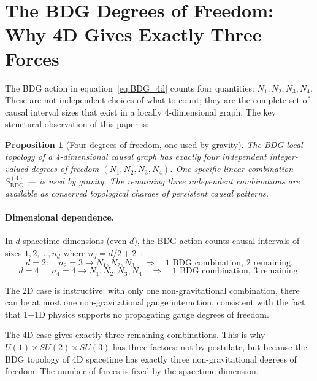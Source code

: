 \documentclass[11pt,a4paper]{article}
\newtheorem{proposition}[theorem]{Proposition}
\newcommand{\SBDG}{S_{\mathrm{BDG}}}
\begin{document}
\section{The BDG Degrees of Freedom: Why 4D Gives Exactly Three Forces}
\label{sec:four_dof}

The BDG action in equation~\eqref{eq:BDG_4d} counts four quantities: $N_1, N_2,
N_3, N_4$. These are not independent choices of what to count; they are the
complete set of causal interval sizes that exist in a locally 4-dimensional
graph. The key structural observation of this paper is:

\begin{proposition}[Four degrees of freedom, one used by gravity]
\label{prop:dof}
The BDG local topology of a 4-dimensional causal graph has exactly four
independent integer-valued degrees of freedom $(N_1, N_2, N_3, N_4)$.
One specific linear combination --- $\SBDG^{(4)}$ --- is used by gravity.
The remaining three independent combinations are available as conserved
topological charges of persistent causal patterns.
\end{proposition}

\paragraph{Dimensional dependence.}
In $d$ spacetime dimensions (even $d$), the BDG action counts causal intervals
of sizes $1, 2, \ldots, n_d$ where $n_d = d/2 + 2$~\citep{Benincasa2010}:
\begin{equation}
  d = 2:\quad n_2 = 3 \to N_1, N_2, N_3
  \quad\Rightarrow\quad \text{1 BDG combination, 2 remaining.}
\end{equation}
\begin{equation}
  d = 4:\quad n_4 = 4 \to N_1, N_2, N_3, N_4
  \quad\Rightarrow\quad \text{1 BDG combination, 3 remaining.}
\end{equation}

The 2D case is instructive: with only one non-gravitational combination,
there can be at most one non-gravitational gauge interaction, consistent
with the fact that 1+1D physics supports no propagating gauge degrees of freedom.

The 4D case gives exactly three remaining combinations. This is why
$U(1) \times SU(2) \times SU(3)$ has three factors: not by postulate, but
because the BDG topology of 4D spacetime has exactly three non-gravitational
degrees of freedom. The number of forces is fixed by the spacetime dimension.
\end{document}
